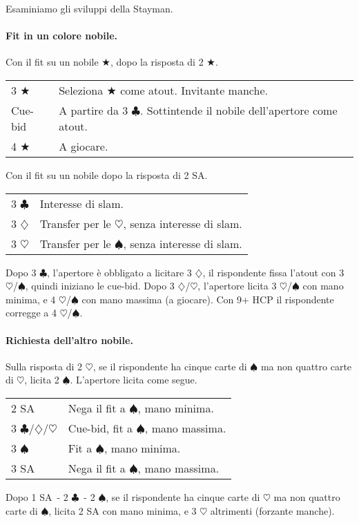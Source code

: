 \documentclass[a4paper,10pt]{article}
\renewcommand{\c}{$\clubsuit$\xspace}
\renewcommand{\d}{$\diamondsuit$\xspace}
\newcommand{\h}{$\heartsuit$\xspace}
\newcommand{\s}{$\spadesuit$\xspace}
\renewcommand{\j}{$\bigstar$\xspace}
\newcommand{\sa}{SA\xspace}
\newcommand{\smallspace}{\vskip0.3cm}
\newenvironment{twocol}
  {\smallspace\noindent\begin{tabular}{l p{0.78\textwidth}}}
  {\end{tabular}\smallspace}
\begin{document}
\noindent Esaminiamo gli sviluppi della Stayman.

\paragraph{Fit in un colore nobile.}

Con il fit su un nobile \j, dopo la risposta di 2 \j.
\begin{twocol}
	3 \j & Seleziona \j come atout. Invitante manche. \\
	Cue-bid & A partire da 3 \c. Sottintende il nobile dell'apertore come atout. \\
	4 \j & A giocare. \\
\end{twocol}

Con il fit su un nobile dopo la risposta di 2 \sa.

\begin{twocol}
	3 \c & Interesse di slam. \\
	3 \d & Transfer per le \h, senza interesse di slam. \\
	3 \h & Transfer per le \s, senza interesse di slam. \\
\end{twocol}

Dopo 3 \c, l'apertore è obbligato a licitare 3 \d, il rispondente fissa l'atout con 3 \h/\s, quindi iniziano le cue-bid.
Dopo 3 \d/\h, l'apertore licita 3 \h/\s con mano minima, e 4 \h/\s con mano massima (a giocare). Con 9+ HCP il rispondente corregge a 4 \h/\s.

\paragraph{Richiesta dell'altro nobile.}
Sulla risposta di 2 \h, se il rispondente ha cinque carte di \s ma non quattro carte di \h, licita 2 \s. L'apertore licita come segue.

\begin{twocol}
	2 \sa & Nega il fit a \s, mano minima. \\
	3 \c/\d/\h & Cue-bid, fit a \s, mano massima. \\
	3 \s & Fit a \s, mano minima. \\
	3 \sa & Nega il fit a \s, mano massima.
\end{twocol}

Dopo 1 \sa\ - 2 \c\ - 2 \s, se il rispondente ha cinque carte di \h ma non quattro carte di \s, licita 2 \sa con mano minima, e 3 \h altrimenti (forzante manche).
\end{document}
